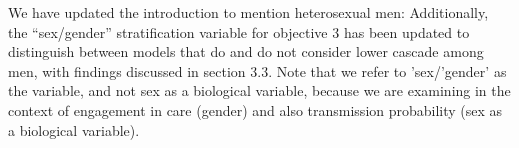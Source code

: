 \begin{comment}\label{hm.gaps}
The third paragraph of the Introduction mentions possible inequalities in uptake of HIV testing and ART as an explanation for the lower-than-expected impact of UTT, and mentions a number of sub-populations that might be disadvantaged. But the authors fail to mention heterosexual men. There is much evidence of heterosexual men being at a disadvantage (in terms of HIV testing and ART uptake) and they also contribute more to transmission than heterosexual women, so why are they not mentioned here? Similarly in the second and third paragraphs of the discussion the authors criticize modelling studies that don't consider key population dynamics, but they don't mention the challenges around engaging heterosexual men (and the problem that many models don't consider differences between men and women in ART coverage). The poor uptake of HIV testing and ART in heterosexual men is really the Achilles heel in the 'treatment as prevention' strategy in Africa, yet this issue is frequently ignored in the literature. I feel the authors could have drawn more attention to this issue throughout the paper, rather than focusing narrowly on the traditionally defined key populations.
\end{comment}
\begin{response}
We have updated the introduction to mention heterosexual men:
Additionally, the ``sex/gender'' stratification variable for objective 3 %
has been updated to distinguish between models that do and do not consider
lower cascade among men,
with findings discussed in section 3.3. Note that we refer to 'sex/'gender' as the variable, and not sex as a biological variable, because we are examining in the context of engagement in care (gender) and also transmission probability (sex as a biological variable).
\end{response}
